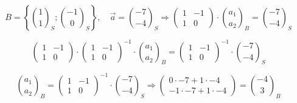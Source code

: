 \begin{example}
    $$
    B=\left\{\binom{1}{1}_{S} ;\binom{-1}{0}_{S}\right\}, \quad \vec{a}=\binom{-7}{-4}_{S} \Rightarrow \begin{pmatrix}
        1 & -1 \\
        1 & 0
        \end{pmatrix} \cdot\binom{a_{1}}{a_{2}}_{B}=\binom{-7}{-4}_{S}
    $$

    $$
    \begin{pmatrix} 1 & -1 \\ 1 & 0 \end{pmatrix} \cdot\begin{pmatrix} 1 & -1 \\ 1 & 0 \end{pmatrix}^{-1} \cdot\binom{a_{1}}{a_{2}}_{B}=\begin{pmatrix} 1 & -1 \\ 1 & 0 \end{pmatrix}^{-1} \cdot\binom{-7}{-4}_{S}
    $$

    $$
    \binom{a_{1}}{a_{2}}_{B} = \begin{pmatrix} 1 & -1 \\ 1 & 0 \end{pmatrix}^{-1} \cdot\binom{-7}{-4}_{S} 
    \Rightarrow \begin{pmatrix} 0 \cdot -7 + 1 \cdot -4 \\ -1 \cdot -7 + 1 \cdot -4 \end{pmatrix} = \binom{-4}{3}_{B}
    $$
\end{example}